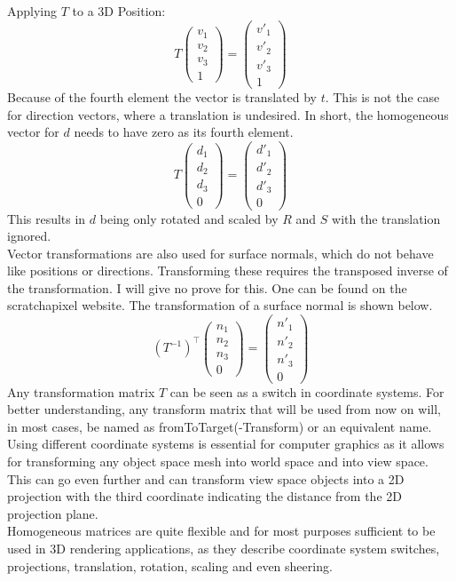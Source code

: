 Applying $T$ to a 3D Position:
\[
T
\begin{pmatrix}
 v_1\\
 v_2\\
 v_3\\
 1
\end{pmatrix}
=
\begin{pmatrix}
 v'_1\\
 v'_2\\
 v'_3\\
 1
\end{pmatrix}\]
\newpage
Because of the fourth element the vector is translated by $t$. This is not the case for direction vectors, where a translation is undesired. In short, the homogeneous vector for $d$ needs to have zero as its fourth element.
\[
T
\begin{pmatrix}
 d_1\\
 d_2\\
 d_3\\
 0
\end{pmatrix}
=
\begin{pmatrix}
 d'_1\\
 d'_2\\
 d'_3\\
 0
\end{pmatrix}\]
This results in $d$ being only rotated and scaled by $R$ and $S$ with the translation ignored.\\
Vector transformations are also used for surface normals, which do not behave like positions or directions. Transforming these requires the transposed inverse of the transformation. I will give no prove for this. One can be found on the scratchapixel \cite{scrathAPixel} website. The transformation of a surface normal is shown below.
\[
(T^{-1})^\intercal
\begin{pmatrix}
 n_1\\
 n_2\\
 n_3\\
 0
\end{pmatrix}
=
\begin{pmatrix}
 n'_1\\
 n'_2\\
 n'_3\\
 0
\end{pmatrix}\]
Any transformation matrix $T$ can be seen as a switch in coordinate systems. For better understanding, any transform matrix that will be used from now on will, in most cases, be named as fromToTarget(-Transform) or an equivalent name.\\
Using different coordinate systems is essential for computer graphics as it allows for transforming any object space mesh into world space and into view space. This can go even further and can transform view space objects into a 2D projection with the third coordinate indicating the distance from the 2D projection plane.\\
Homogeneous matrices are quite flexible and for most purposes sufficient to be used in 3D rendering applications, as they describe coordinate system switches, projections, translation, rotation, scaling and even sheering.
